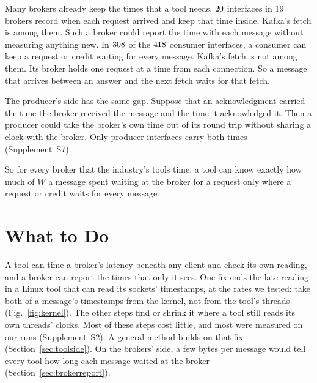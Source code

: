 \documentclass[10pt,journal,compsoc]{IEEEtran}
\newcommand{\kafka}{Kafka}
\begin{document}
Many brokers already keep the times that a tool needs. $20$ interfaces in
$19$ brokers record when each request arrived and keep that time inside. \kafka{}'s fetch is among them. Such a broker
could report the time with each message without measuring anything new. In $308$ of the
$418$ consumer interfaces, a consumer can keep a request or credit waiting for every
message. \kafka{}'s fetch is not among them. Its broker holds one request at a time from each
connection. So a message that arrives between an answer and the next fetch waits for that fetch.

The producer's side has the same gap. Suppose that an acknowledgment carried the time the broker
received the message and the time it acknowledged it. Then a producer could take the broker's own
time out of its round trip without sharing a clock with the broker.  Only \baHoldModesWord{} producer interfaces  carry both times (Supplement~S7).

So for every broker that the industry's tools time, a tool can know exactly how much of $W$ a
message spent waiting at the broker for a request only where a request or credit waits for every
message.

\section{What to Do}
\label{sec:practice}
\label{sec:discussion}
\label{sec:checks}

A tool can time a broker's latency beneath any client and check its own reading, and a broker can
report the times that only it sees. One fix ends the late reading in a Linux tool that can read its
sockets' timestamps, at the rates we tested: take both of a message's timestamps from the kernel,
not from the tool's threads (Fig.~\ref{fig:kernel}). The other steps find or shrink it where a
tool still reads its own threads' clocks. Most of these steps cost little, and most were measured on our runs (Supplement~S2). A general method builds on that
fix (Section~\ref{sec:toolside}). On the brokers' side, a few bytes per message would tell
every tool how long each message waited at the broker (Section~\ref{sec:brokerreport}).
\end{document}
